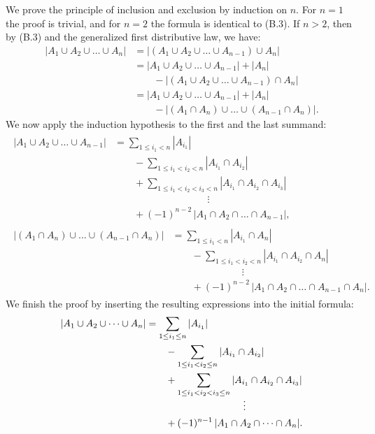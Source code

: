 We prove the principle of inclusion and exclusion by induction on $n$.
For $n=1$ the proof is trivial, and for $n=2$ the formula is identical to (B.3).
If $n>2$, then by (B.3) and the generalized first distributive law, we have:
\begin{align*}
    |A_1\cup A_2\cup\dots\cup A_n| &= |(A_1\cup A_2\cup\dots\cup A_{n-1})\cup A_n| \\
    &= |A_1\cup A_2\cup\dots\cup A_{n-1}|+|A_n| \\
    &\qquad {}-|(A_1\cup A_2\cup\dots\cup A_{n-1})\cap A_n| \\
    &= |A_1\cup A_2\cup\dots\cup A_{n-1}|+|A_n| \\
    &\qquad {}-|(A_1\cap A_n)\cup\dots\cup(A_{n-1}\cap A_n)|.
\end{align*}
We now apply the induction hypothesis to the first and the last summand:
\begin{gather*}
    \begin{align*}
        |A_1\cup A_2\cup\dots\cup A_{n-1}| &= \sum_{1\le i_1<n}|A_{i_1}| \\
        &\qquad {}-\sum_{1\le i_1<i_2<n}|A_{i_1}\cap A_{i_2}| \\
        &\qquad {}+\sum_{1\le i_1<i_2<i_3<n}|A_{i_1}\cap A_{i_2}\cap A_{i_3}| \\[-2mm]
        &\hspace{4cm}\vdots \\
        &\qquad {}+(-1)^{n-2}\,|A_1\cap A_2\cap\dots\cap A_{n-1}|,
    \end{align*}\\[5mm]
    \begin{align*}
        |(A_1\cap A_n)\cup\dots\cup(A_{n-1}\cap A_n)| &= \sum_{1\le i_1<n}|A_{i_1}\cap A_n| \\
        &\qquad {}-\sum_{1\le i_1<i_2<n}|A_{i_1}\cap A_{i_2}\cap A_n| \\[-2mm]
        &\hspace{3cm}\vdots \\
        &\qquad {}+(-1)^{n-2}\,|A_1\cap A_2\cap\dots\cap A_{n-1}\cap A_n|.
    \end{align*}
\end{gather*}
We finish the proof by inserting the resulting expressions into the initial formula:
\begin{align*}
    |A_1\cup A_2\cup\dots\cup A_n| &= \sum_{1\le i_1\le n}|A_{i_1}| \\
    &\qquad {}-\sum_{1\le i_1<i_2\le n}|A_{i_1}\cap A_{i_2}| \\
    &\qquad {}+\sum_{1\le i_1<i_2<i_3\le n}|A_{i_1}\cap A_{i_2}\cap A_{i_3}| \\[-2mm]
    &\hspace{3.5cm}\vdots \\
    &\qquad {}+(-1)^{n-1}\,|A_1\cap A_2\cap\dots\cap A_n|.
\end{align*}
